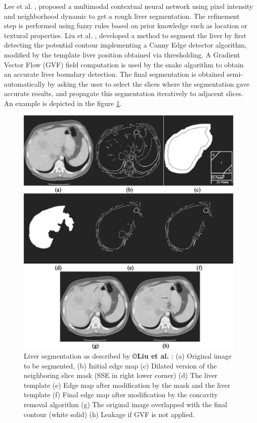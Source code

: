 Lee et al. \cite{Lee2003}, proposed a multimodal contextual neural network using
pixel intensity and neighborhood dynamic to get a rough liver
segmentation. The refinement step is performed using fuzzy rules based
on prior knowledge such as location or textural properties.
Liu et al. \cite{Liu2005}, developed a method to segment the liver by first detecting the potential
contour implementing a Canny Edge detector algorithm, modified by the
template liver position obtained via thresholding. A Gradient Vector
Flow (GVF) field computation is used by the snake algorithm to obtain an
accurate liver boundary detection. The final segmentation is obtained
semi-automatically by asking the user to select the slices where the
segmentation gave accurate results, and propagate this segmentation
iteratively to adjacent slices. An example is depicted in the figure \ref{LiuGVF}.
\begin{figure} [ht!]
	\centering
	\includegraphics[width=0.6\linewidth]{images/Liu2005_Fig6}
	\caption{Liver segmentation as described by \textbf{©Liu et al. \cite{Liu2005}} : (a) Original image to be segmented, (b) Initial edge map (c) Dilated version of the neighboring slice mask (SSE in right lower corner) (d) The liver template (e) Edge map after modification by the mask and the liver template (f) Final edge map after modification by the concavity removal algorithm (g) The original image overlapped with the final contour (white solid) (h) Leakage if GVF is not applied.}
	\label{LiuGVF}
\end{figure}



